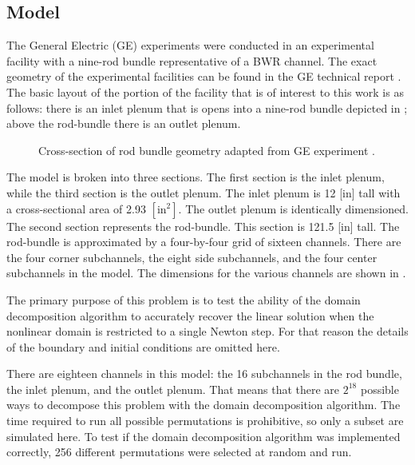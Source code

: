 \subsection{Model}
\label{sect:complexModel}

The General Electric (GE) experiments were conducted in an experimental facility with a nine-rod bundle representative of a BWR channel.
The exact geometry of the experimental facilities can be found in the GE technical report \cite{Lahey1970}.
The basic layout of the portion of the facility that is of interest to this work is as follows: there is an inlet plenum that is opens into a nine-rod bundle depicted in ; above the rod-bundle there is an outlet plenum.

\begin{figure}[h!tb]
\centering

\caption{Cross-section of rod bundle geometry adapted from GE experiment \cite{Lahey1970}.}
\label{fig:channel_layout}
\end{figure}

The \cobra{} model is broken into three sections.
The first section is the inlet plenum, while the third section is the outlet plenum.
The inlet plenum is 12 [in] tall with a cross-sectional area of 2.93 $[ \text{in}^2]$.
The outlet plenum is identically dimensioned.
The second section represents the rod-bundle.
This section is 121.5 [in] tall.
The rod-bundle is approximated by a four-by-four grid of sixteen channels.
There are the four corner subchannels, the eight side subchannels, and the four center subchannels in the model.
The dimensions for the various channels are shown in .

The primary purpose of this problem is to test the ability of the domain decomposition algorithm to accurately recover the linear solution when the nonlinear domain is restricted to a single Newton step.
For that reason the details of the boundary and initial conditions are omitted here.

There are eighteen channels in this model: the 16 subchannels in the rod bundle, the inlet plenum, and the outlet plenum.
That means that there are $2^{18}$ possible ways to decompose this problem with the domain decomposition algorithm.
The time required to run all possible permutations is prohibitive, so only a subset are simulated here.
To test if the domain decomposition algorithm was implemented correctly, 256 different permutations were selected at random and run.

